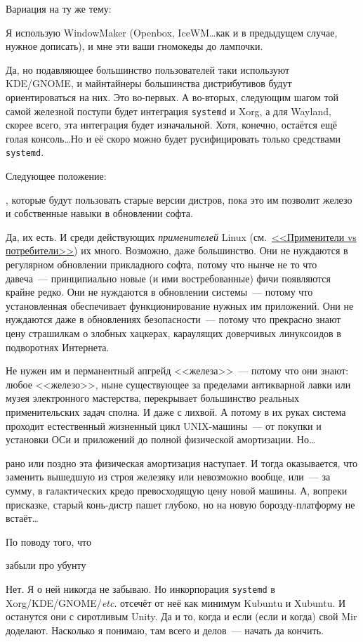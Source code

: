 Вариация на ту же тему:

\begin{shadequote}{}
Я использую WindowMaker (Openbox, IceWM\dots как и в предыдущем случае, нужное дописать), и мне эти ваши гномокеды до лампочки.
\end{shadequote}
Да, но подавляющее большинство пользователей таки используют KDE/GNOME, и майнтайнеры большинства дистрибутивов будут ориентироваться на них. Это во-первых. А во-вторых, следующим шагом той самой железной поступи будет интеграция \texttt{systemd} и Xorg, а для Wayland, скорее всего, эта интеграция будет изначальной. Хотя, конечно, остаётся ещё голая консоль\dots Но и её скоро можно будет русифицировать только средствами \texttt{systemd}.

Следующее положение:
\begin{shadequote}{}
, которые будут пользовать старые версии дистров, пока это им позволит железо и собственные навыки в обновлении софта.
\end{shadequote}
Да, их есть. И среди действующих \textit{применителей} Linux (см.~\hyperlink{customers}{<<Применители vs потребители>>}) их много. Возможно, даже большинство. Они не нуждаются в регулярном обновлении прикладного софта, потому что нынче не то что давеча~--- принципиально новые (и ими востребованные) фичи появляются крайне редко. Они не нуждаются в обновлении системы~--- потому что установленная обеспечивает функционирование нужных им приложений. Они не нуждаются даже в обновлениях безопасности~--- потому что прекрасно знают цену страшилкам о злобных хацкерах, караулящих доверчивых линуксоидов в подворотнях Интернета.

Не нужен им и перманентный апгрейд <<железа>>~--- потому что они знают: любое <<железо>>, ныне существующее за пределами антикварной лавки или музея электронного мастерства, перекрывает большинство реальных применительских задач сполна. И даже с лихвой. А потому в их руках система проходит естественный жизненный цикл UNIX-машины~--- от покупки и установки ОСи и приложений до полной физической амортизации. Но\dots

 рано или поздно эта физическая амортизация наступает. И тогда оказывается, что заменить вышедшую из строя железяку или невозможно вообще, или~--- за сумму, в галактических кредо превосходящую цену новой машины. А, вопреки присказке, старый конь-дистр пашет глубоко, но на новую борозду-платформу не встаёт\dots

По поводу того, что
\begin{shadequote}{}
 забыли про убунту
\end{shadequote}
Нет. Я о ней никогда не забываю. Но инкорпорация \texttt{systemd} в Xorg/KDE/GNOME/\textit{etc}. отсечёт от неё как минимум Kubuntu и Xubuntu. И останутся они с сиротливым Unity. Да и то, когда и если (если и когда) свой Mir доделают. Насколько я понимаю, там всего и делов~--- начать да кончить.

